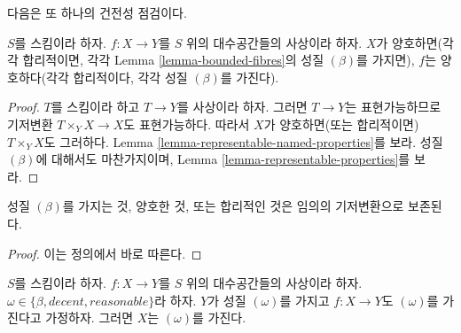 \noindent
다음은 또 하나의 건전성 점검이다.

\begin{lemma}
\label{lemma-property-for-morphism-out-of-property}
$S$를 스킴이라 하자. $f : X \to Y$를 $S$ 위의 대수공간들의
사상이라 하자. $X$가 양호하면(각각 합리적이면, 각각 Lemma
\ref{lemma-bounded-fibres}의 성질 $(\beta)$를 가지면), $f$는
양호하다(각각 합리적이다, 각각 성질 $(\beta)$를 가진다).
\end{lemma}

\begin{proof}
$T$를 스킴이라 하고 $T \to Y$를 사상이라 하자. 그러면 $T \to Y$는
표현가능하므로 기저변환 $T \times_Y X \to X$도 표현가능하다.
따라서 $X$가 양호하면(또는 합리적이면) $T \times_Y X$도 그러하다.
Lemma \ref{lemma-representable-named-properties}를 보라. 성질 $(\beta)$에
대해서도 마찬가지이며, Lemma \ref{lemma-representable-properties}를 보라.
\end{proof}

\begin{lemma}
\label{lemma-base-change-relative-conditions}
성질 $(\beta)$를 가지는 것, 양호한 것, 또는 합리적인 것은 임의의
기저변환으로 보존된다.
\end{lemma}

\begin{proof}
이는 정의에서 바로 따른다.
\end{proof}

\begin{lemma}
\label{lemma-property-over-property}
$S$를 스킴이라 하자.
$f : X \to Y$를 $S$ 위의 대수공간들의 사상이라 하자.
$\omega \in \{\beta, decent, reasonable\}$라 하자.
$Y$가 성질 $(\omega)$를 가지고 $f : X \to Y$도 $(\omega)$를
가진다고 가정하자. 그러면 $X$는 $(\omega)$를 가진다.
\end{lemma}

